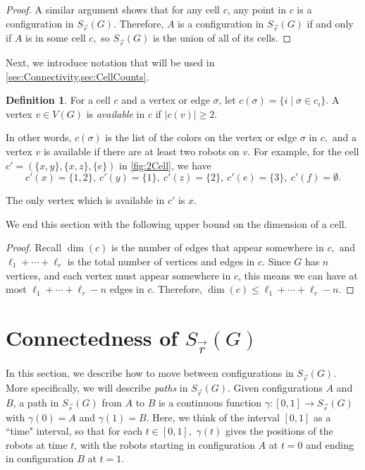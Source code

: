 \documentclass{amsart}
\newcommand{\Sr}{S_{\vec{r}}}
\newcommand{\from}{\!:}
\newtheorem{prop}[thm]{Proposition}
\theoremstyle{definition}
\newtheorem{defn}[thm]{Definition}
\theoremstyle{remark}
\begin{document}
\begin{proof}
    A similar argument shows that for any cell $c$, any point in $c$ is a configuration in $\Sr(G)$. Therefore, $A$ is a configuration in $\Sr(G)$ if and only if $A$ is in some cell $c,$ so $\Sr(G)$ is the union of all of its cells.
\end{proof}

Next, we introduce notation that will be used in \cref{sec:Connectivity,sec:CellCounts}.
\begin{defn}
    For a cell $c$ and a vertex or edge $\sigma$, let $c(\sigma)=\{i\mid \sigma\in c_i\}$. A vertex $v\in V(G)$ is \textit{available} in $c$ if $|c(v)|\ge 2.$
\end{defn} 

In other words, $c(\sigma)$ is the list of the colors on the vertex or edge $\sigma$ in $c,$ and a vertex $v$ is available if there are at least two robots on $v$. For example, for the cell $c'=(\{x,y\},\{x,z\},\{e\})$ in \cref{fig:2Cell}, we have 
\[
c'(x)=\{1,2\},\ c'(y)=\{1\},\ c'(z)=\{2\},\ c'(e)=\{3\},\ c'(f)=\emptyset.
\]

The only vertex which is available in $c'$ is $x.$ 

We end this section with the following upper bound on the dimension of a cell.


\begin{proof}
    Recall $\dim(c)$ is the number of edges that appear somewhere in $c,$ and $\ell_1+\cdots+\ell_r$ is the total number of vertices and edges in $c$. Since $G$ has $n$ vertices, and each vertex must appear somewhere in $c$, this means we can have at most $\ell_1+\cdots+\ell_r-n$ edges in $c.$ Therefore, $\dim(c)\le\ell_1+\cdots+\ell_r-n.$
\end{proof}

\section{Connectedness of $\Sr(G)$}\label{sec:Connectivity}

In this section, we describe how to move between configurations in $\Sr(G).$ More specifically, we will describe \textit{paths} in $\Sr(G).$ Given configurations $A$ and $B$, a path in $\Sr(G)$ from $A$ to $B$ is a continuous function $\gamma\from[0,1]\to \Sr(G)$ with $\gamma(0)=A$ and $\gamma(1)=B.$ Here, we think of the interval $[0,1]$ as a ``time" interval, so that for each $t\in[0,1],$ $\gamma(t)$ gives the positions of the robots at time $t$, with the robots starting in configuration $A$ at $t=0$ and ending in configuration $B$ at $t=1.$
\end{document}
